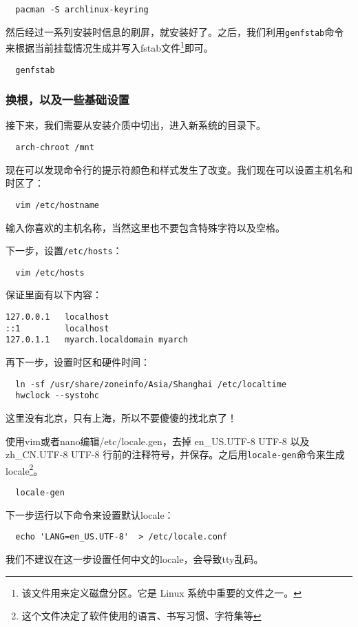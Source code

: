 \begin{lstlisting}
  pacman -S archlinux-keyring
\end{lstlisting}

然后经过一系列安装时信息的刷屏，就安装好了。之后，我们利用\texttt{genfstab}命令来根据当前挂载情况生成并写入fstab文件\footnote{该文件用来定义磁盘分区。它是 Linux 系统中重要的文件之一。}即可。

\begin{lstlisting}
  genfstab
\end{lstlisting}

\subsubsection{换根，以及一些基础设置}

接下来，我们需要从安装介质中切出，进入新系统的目录下。

\begin{lstlisting}
  arch-chroot /mnt
\end{lstlisting}

现在可以发现命令行的提示符颜色和样式发生了改变。我们现在可以设置主机名和时区了：
\begin{lstlisting}
  vim /etc/hostname
\end{lstlisting}
输入你喜欢的主机名称，当然这里也不要包含特殊字符以及空格。

下一步，设置\texttt{/etc/hosts}：
\begin{lstlisting}
  vim /etc/hosts
\end{lstlisting}
保证里面有以下内容：
\begin{lstlisting}
127.0.0.1   localhost
::1         localhost
127.0.1.1   myarch.localdomain myarch
\end{lstlisting}

再下一步，设置时区和硬件时间：
\begin{lstlisting}
  ln -sf /usr/share/zoneinfo/Asia/Shanghai /etc/localtime
  hwclock --systohc
\end{lstlisting}
这里没有北京，只有上海，所以不要傻傻的找北京了！

使用vim或者nano编辑/etc/locale.gen，去掉 en\_US.UTF-8 UTF-8 以及 zh\_CN.UTF-8 UTF-8 行前的注释符号，并保存。之后用\texttt{locale-gen}命令来生成locale\footnote{这个文件决定了软件使用的语言、书写习惯、字符集等}。

\begin{lstlisting}
  locale-gen
\end{lstlisting}

下一步运行以下命令来设置默认locale：
\begin{lstlisting}
  echo 'LANG=en_US.UTF-8'  > /etc/locale.conf
\end{lstlisting}
我们不建议在这一步设置任何中文的locale，会导致tty乱码。

